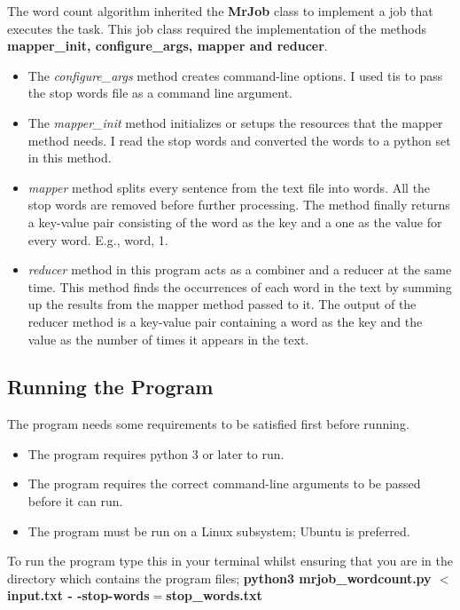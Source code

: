 \documentclass[12pt, a4paper, fleqn, titlepage]{article}
\begin{document}
        The word count algorithm inherited the \textbf{MrJob} class to implement a job that executes the task. This job class required the implementation of the methods \textbf{mapper\_init, configure\_args, mapper and reducer}. 
            \begin{itemize}
                \item The \emph{configure\_args} method creates command-line options. I used tis to pass the stop words file as a command line argument.
                \item The \emph{mapper\_init} method initializes or setups the resources that the mapper method needs. I read the stop words and converted the words to a python set in this method.
                \item \emph{mapper} method splits every sentence from the text file into words.
                All the stop words are removed before further processing. The method
                finally returns a key-value pair consisting of the word as the key and a one as the value for every word. E.g., word, 1.
                \item \emph{reducer} method in this program acts as a combiner and a reducer
                at the same time. This method finds the occurrences of each word in the
                text by summing up the results from the mapper method passed to it.
                The output of the reducer method is a key-value pair containing a word
                as the key and the value as the number of times it appears in the text.
            \end{itemize}
    \subsection*{Running the Program}
            The program needs some requirements to be satisfied first before running.
                \begin{itemize}
                    \item The program requires python 3 or later to run.
                    \item The program requires the correct command-line arguments to be passed before it can run.
                    \item The program must be run on a Linux subsystem; Ubuntu is preferred.
                \end{itemize}
            
            To run the program type this in your terminal whilst ensuring that you are in the directory which contains the program files;
            \textbf{python3 mrjob\_wordcount.py $<$input.txt - -stop-words$=$stop\_words.txt}
\end{document}
